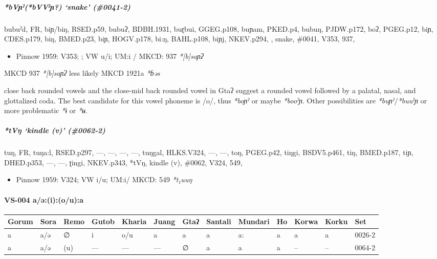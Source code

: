 \documentclass[a4paper,]{article}
\providecommand{\tightlist}{%
  \setlength{\itemsep}{0pt}\setlength{\parskip}{0pt}}
\let\oldparagraph\paragraph
\renewcommand{\paragraph}[1]{\oldparagraph{#1}\mbox{}}
\let\oldsubparagraph\subparagraph
\renewcommand{\subparagraph}[1]{\oldsubparagraph{#1}\mbox{}}
\begin{document}
\subparagraph{\texorpdfstring{\emph{*bVɲˀ(*bVVˀɲ?)} `snake'
(\#0041-2)}{*bVɲˀ(*bVVˀɲ?) snake (\#0041-2)}}\label{bvux272ux2c0bvvux2c0ux272-snake-0041-2}

bubuˀd, FR, biɲ/biŋ, RSED.p59, bubuʔ, BDBH.1931, buɽbui, GGEG.p108,
buɲam, PKED.p4, bubuŋ, PJDW.p172, boʔ, PGEG.p12, biɲ, CDES.p179, biŋ,
BMED.p23, biɲ, HOGV.p178, bi:ŋ, BAHL.p108, biɲj, NKEV.p294, , snake,
\#0041, V353, 937,

\begin{itemize}
\tightlist
\item
  Pinnow 1959: V353; ; VW u/i; UM:i / MKCD: 937 \emph{*{[}b{]}saɲʔ}
\end{itemize}

MKCD 937 \emph{*{[}b{]}saɲʔ} less likely MKCD 1921a \emph{*ɓəs}

close back rounded vowels and the close-mid back rounded vowel in Gtaʔ
suggest a rounded vowel followed by a palatal, nasal, and glottalized
coda. The best candidate for this vowel phoneme is /o/, thus
\emph{*boɲˀ} or maybe \emph{*booˀɲ}. Other possibilities are
\emph{*buɲˀ}/\emph{*buuˀɲ} or more problematic \emph{*ɨ} or \emph{*ʉ}.

\subparagraph{\texorpdfstring{\emph{*tVŋ} `kindle (v)'
(\#0062-2)}{*tVŋ kindle (v) (\#0062-2)}}\label{tvux14b-kindle-v-0062-2}

tuŋ, FR, tuŋa:l, RSED.p297, ---, ---, ---, ---, tuŋgal, HLKS.V324, ---,
---, toŋ, PGEG.p42, tiŋgi, BSDV5.p461, tiŋ, BMED.p187, tiɲ, DHED.p353,
---, ---, ʈingi, NKEV.p343, *tVŋ, kindle (v), \#0062, V324, 549,

\begin{itemize}
\tightlist
\item
  Pinnow 1959: V324; VW i/u; UM:i/ MKCD: 549 \emph{*t₁uuŋ}
\end{itemize}

\paragraph{VS-004 a/ə:(i):(o/u):a}\label{vs-004-aux259ioua}

\begin{longtable}[]{@{}lllllllllllll@{}}
\toprule
Gorum & Sora & Remo & Gutob & Kharia & Juang & Gtaʔ & Santali & Mundari
& Ho & Korwa & Korku & Set\tabularnewline
\midrule
\endhead
a & a/ə & ∅ & i & o/u & a & a & a & a: & a & a & a &
0026-2\tabularnewline
a & a/ə & (u) & --- & --- & --- & ∅ & a & a & a & -- & -- &
0064-2\tabularnewline
\bottomrule
\end{longtable}
\end{document}
